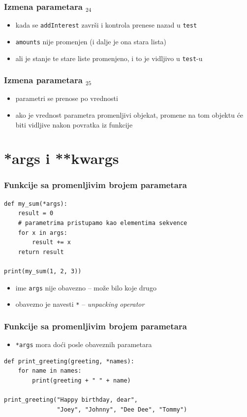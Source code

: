 \documentclass[compress]{beamer}
\begin{document}
\begin{frame}[fragile]
  \frametitle{Izmena parametara $_{24}$}
  \begin{itemize}
    \item kada se \texttt{addInterest} završi i kontrola prenese nazad u \texttt{test}
    \item \texttt{amounts} nije promenjen (i dalje je ona stara lista)
    \item ali je stanje te stare liste promenjeno, i to je vidljivo u \texttt{test}-u
  \end{itemize}
\end{frame}

\begin{frame}[fragile]
  \frametitle{Izmena parametara $_{25}$}
  \begin{itemize}
    \item parametri se  prenose po vrednosti
    \item ako je vrednost parametra promenljivi objekat, promene na tom objektu će biti vidljive nakon povratka iz funkcije
  \end{itemize}
\end{frame}

\section{*args i **kwargs}

\begin{frame}[fragile]
  \frametitle{Funkcije sa promenljivim brojem parametara}
\begin{verbatim}
def my_sum(*args):
    result = 0
    # parametrima pristupamo kao elementima sekvence
    for x in args:
        result += x
    return result

print(my_sum(1, 2, 3))
\end{verbatim}
  \begin{itemize}
    \item ime \texttt{args} nije obavezno -- može bilo koje drugo
    \item obavezno je navesti \texttt{*} -- \textit{unpacking operator}
  \end{itemize}
\end{frame}

\begin{frame}[fragile]
  \frametitle{Funkcije sa promenljivim brojem parametara}
  \begin{itemize}
    \item \texttt{*args} mora doći posle obaveznih parametara
  \end{itemize}
\begin{verbatim}
def print_greeting(greeting, *names):
    for name in names:
        print(greeting + " " + name)

print_greeting("Happy birthday, dear", 
               "Joey", "Johnny", "Dee Dee", "Tommy")
\end{verbatim}
\end{frame}
\end{document}
